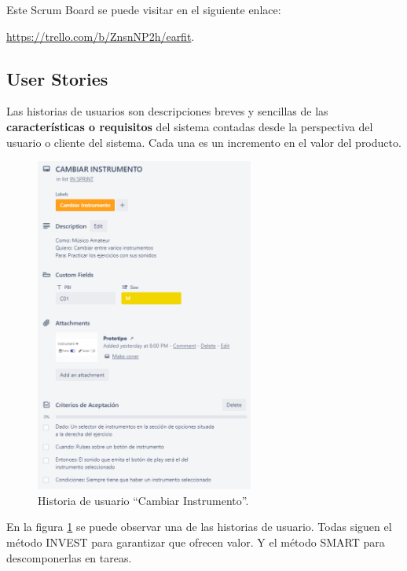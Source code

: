 \documentclass[12pt,twoside,titlepage]{report}
\begin{document}
Este Scrum Board se puede visitar en el siguiente enlace: 

\url{https://trello.com/b/ZnsnNP2h/earfit}.

\subsection{User Stories}

Las historias de usuarios son descripciones breves y sencillas de las \textbf{características o requisitos} del sistema contadas desde la perspectiva del usuario o cliente del sistema. Cada una es un incremento en el valor del producto.
\cite{userstories1}
\cite{userstories2}

\begin{figure}[H]
    \centering
    \includegraphics[width=0.64\textwidth]{Scrum/UserStory}
    \caption{Historia de usuario ``Cambiar Instrumento''.}
    \label{fig:UserStory}
\end{figure}

En la figura \ref{fig:UserStory} se puede observar una de las historias de usuario. Todas siguen el método INVEST para garantizar que ofrecen valor. Y el método SMART para descomponerlas en tareas. \cite{invest}
 

\end{document}
